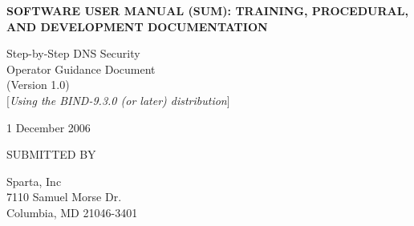 \documentclass[12pt]{article}
\begin{document}

\begin{titlepage}

\vspace{.5in}

\begin{center}
\LARGE{\bf
SOFTWARE USER MANUAL (SUM):
TRAINING, PROCEDURAL, AND
DEVELOPMENT DOCUMENTATION
}
\vspace{.5in}

\Large{
Step-by-Step DNS Security\\
Operator Guidance Document\\
(Version 1.0)}\\
$[${\it Using the BIND-9.3.0 (or later) distribution}$]$
\vspace{0.5in}

% 
\vspace{2in}
1 December 2006
\end{center}

\vspace{.5in}

SUBMITTED BY

Sparta, Inc\\
7110 Samuel Morse Dr.\\
Columbia, MD 21046-3401
\vspace{0.25in}


\end{titlepage}

\end{document}
